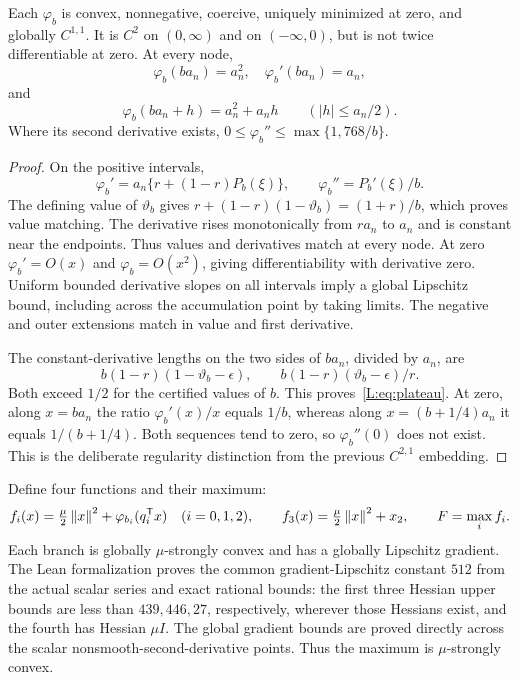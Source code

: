 \begin{lemma}\label{L:lem:scalar}
Each $\varphi_b$ is convex, nonnegative, coercive, uniquely minimized at zero, and globally $C^{1,1}$. It is $C^2$ on $(0,\infty)$ and on $(-\infty,0)$, but is not twice differentiable at zero. At every node,
\[
 \varphi_b(ba_n)=a_n^2,\quad \varphi_b'(ba_n)=a_n,
\]
and
\begin{equation}\label{L:eq:plateau}
 \varphi_b(ba_n+h)=a_n^2+a_nh\qquad (|h|\le a_n/2).
\end{equation}
Where its second derivative exists, $0\le\varphi_b''\le\max\{1,768/b\}$.
\end{lemma}
\begin{proof}
On the positive intervals,
\[
 \varphi_b'=a_n\{r+(1-r)P_b(\xi)\},\qquad
 \varphi_b''=P_b'(\xi)/b.
\]
The defining value of $\vartheta_b$ gives
$r+(1-r)(1-\vartheta_b)=(1+r)/b$, which proves value matching. The derivative rises monotonically from $ra_n$ to $a_n$ and is constant near the endpoints. Thus values and derivatives match at every node. At zero $\varphi_b'=O(x)$ and $\varphi_b=O(x^2)$, giving differentiability with derivative zero. Uniform bounded derivative slopes on all intervals imply a global Lipschitz bound, including across the accumulation point by taking limits. The negative and outer extensions match in value and first derivative.

The constant-derivative lengths on the two sides of $ba_n$, divided by $a_n$, are
\[
 b(1-r)(1-\vartheta_b-\epsilon),\qquad
 b(1-r)(\vartheta_b-\epsilon)/r.
\]
Both exceed $1/2$ for the certified values of $b$. This proves~\eqref{L:eq:plateau}. At zero, along $x=ba_n$ the ratio $\varphi_b'(x)/x$ equals $1/b$, whereas along $x=(b+1/4)a_n$ it equals $1/(b+1/4)$. Both sequences tend to zero, so $\varphi_b''(0)$ does not exist. This is the deliberate regularity distinction from the previous $C^{2,1}$ embedding.
\end{proof}

Define four functions and their maximum:
\begin{equation}\label{L:eq:embedding}
 f_i(x)=\tfrac\mu2\left\lVert x\right\rVert^2+\varphi_{b_i}(q_i^{\mathsf T} x)\quad (i=0,1,2),\qquad
 f_3(x)=\tfrac\mu2\left\lVert x\right\rVert^2+x_2,\qquad F=\max_i f_i.
\end{equation}
Each branch is globally $\mu$-strongly convex and has a globally Lipschitz gradient. The Lean formalization proves the common gradient-Lipschitz constant $512$ from the actual scalar series and exact rational bounds: the first three Hessian upper bounds are less than $439,446,27$, respectively, wherever those Hessians exist, and the fourth has Hessian $\mu I$. The global gradient bounds are proved directly across the scalar nonsmooth-second-derivative points. Thus the maximum is $\mu$-strongly convex.

